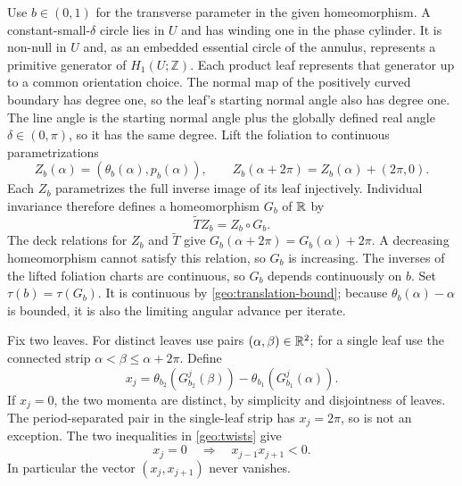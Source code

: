 Use $b\in(0,1)$ for the transverse parameter in the given homeomorphism.
A constant-small-$\delta$ circle lies in $U$ and has winding one in the
phase cylinder. It is non-null in $U$ and, as an embedded essential circle
of the annulus, represents a primitive generator of $H_1(U;\mathbb Z)$.
Each product leaf represents that generator up to a common orientation
choice. The normal map of the positively curved boundary has degree one,
so the leaf's starting normal angle also has degree one. The line
angle is the starting normal angle plus the globally defined real angle
$\delta\in(0,\pi)$, so it has the same degree. Lift the foliation to
continuous parametrizations
\begin{equation}\label{geo:leaf-lifts}
 Z_b(\alpha)=(\theta_b(\alpha),p_b(\alpha)),\qquad
 Z_b(\alpha+2\pi)=Z_b(\alpha)+(2\pi,0).
\end{equation}
Each $Z_b$ parametrizes the full inverse image of its leaf injectively.
Individual invariance therefore defines a homeomorphism $G_b$ of $\mathbb{R}$ by
\[
 \widetilde T Z_b=Z_b\circ G_b.
\]
The deck relations for $Z_b$ and $\widetilde T$ give
$G_b(\alpha+2\pi)=G_b(\alpha)+2\pi$. A decreasing homeomorphism
cannot satisfy this relation, so $G_b$ is increasing.
The inverses of the lifted foliation charts are continuous,
so $G_b$ depends continuously on $b$.  Set $\tau(b)=\tau(G_b)$.
It is continuous by \eqref{geo:translation-bound}; because
$\theta_b(\alpha)-\alpha$ is bounded, it is also the limiting angular
advance per iterate.

Fix two leaves.  For distinct leaves use pairs $(\alpha,\beta)\in\mathbb{R}^2$;
for a single leaf use the connected strip
$\alpha<\beta\le\alpha+2\pi$.  Define
\begin{equation}\label{geo:separation}
 x_j=\theta_{b_2}(G_{b_2}^j(\beta))
                  -\theta_{b_1}(G_{b_1}^j(\alpha)).
\end{equation}
If $x_j=0$, the two momenta are distinct, by simplicity and disjointness
of leaves.  The period-separated pair in the single-leaf strip has
$x_j=2\pi$, so is not an exception.  The two inequalities in
\eqref{geo:twists} give
\begin{equation}\label{geo:opposite-signs}
 x_j=0\quad\Longrightarrow\quad x_{j-1}x_{j+1}<0.
\end{equation}
In particular the vector $(x_j,x_{j+1})$ never vanishes.

